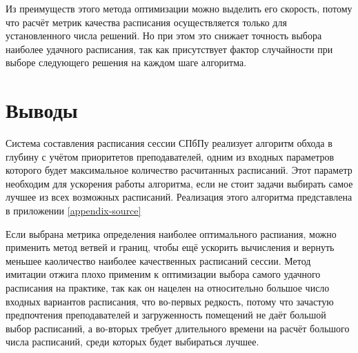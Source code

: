 Из преимуществ этого метода оптимизации можно выделить его скорость, потому что расчёт метрик качества расписания осуществляется только для установленного числа решений. Но при этом это снижает точность выбора наиболее удачного расписания, так как присутствует фактор случайности при выборе следующего решения на каждом шаге алгоритма.
\FloatBarrier
\section{Выводы} \label{ch2:conclusion}

Система составления расписания сессии СПбПу реализует алгоритм обхода в глубину с учётом приоритетов преподавателей, одним из входных параметров которого будет максимальное количество расчитанных расписаний. Этот параметр необходим для ускорения работы алгоритма, если не стоит задачи выбирать самое лучшее из всех возможных расписаний. Реализация этого алгоритма представлена в приложении \ref{appendix-source}

Если выбрана метрика определения наиболее оптимального распиания, можно применить метод ветвей и границ, чтобы ещё ускорить вычисления и вернуть меньшее каоличество наиболее качественных расписаний сессии. Метод имитации отжига плохо применим к оптимизации выбора самого удачного расписания на практике, так как он нацелен на относительно большое число входных вариантов расписания, что во-первых редкость, потому что зачастую предпочтения преподавателей и загруженность помещений не даёт большой выбор расписаний, а во-вторых требует длительного времени на расчёт большого числа расписаний, среди которых будет выбираться лучшее.